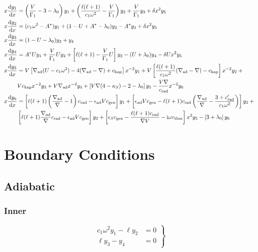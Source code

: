 \documentclass{article}
\newcommand{\diff}{\ensuremath{\mathrm{d}}}
\newcommand{\ii}{\ensuremath{\mathrm{i}}}
\newcommand{\lz}{\ensuremath{\lambda_{0}}}
\newcommand{\Vg}{\ensuremath{\frac{V}{\Gamma_{1}}}}
\newcommand{\As}{\ensuremath{A^{\ast}}}
\newcommand{\nabad}{\ensuremath{\nabla_{\rm ad}}}
\newcommand{\kapS}{\ensuremath{\kappa_{S}}}
\newcommand{\epsad}{\ensuremath{\epsilon_{\rm ad}}}
\newcommand{\epsS}{\ensuremath{\epsilon_{S}}}
\newcommand{\crad}{\ensuremath{c_{\rm rad}}}
\newcommand{\cgen}{\ensuremath{c_{\rm gen}}}
\newcommand{\cthm}{\ensuremath{c_{\rm thm}}}
\newcommand{\ckap}{\ensuremath{c_{\rm kap}}}
\begin{document}
\begin{align*}
x \frac{\diff y_{1}}{\diff x} &=
\left(\Vg - 3 - \lz \right) y_{1} +
\left(\frac{\ell(\ell+1)}{c_{1} \omega^{2}} - \Vg \right) y_{2} +
\Vg y_{3} +
\delta x^{2} y_{5} \\
x \frac{\diff y_{2}}{\diff x} &=
(c_{1} \omega^{2} - \As ) y_{1} +
(1 - U + \As - \lz) y_{2} -
\As y_{3} +
\delta x^{2} y_{5} \\
x \frac{\diff y_{3}}{\diff x} &=
(1 - U - \lz) y_{3} +
y_{4} \\
x \frac{\diff y_{4}}{\diff x} &=
\As U y_{1} +
\Vg U y_{2} +
\left[ \ell(\ell+1) - \Vg U \right] y_{3} -
(U + \lz) y_{4}
- \delta U x^{2} y_{5} \\
x \frac{\diff y_{5}}{\diff x} &=
V \left[ \nabad (U - c_{1}\omega^{2}) - 4 (\nabad - \nabla) + \ckap \right] x^{-2} y_{1} + 
V \left[ \frac{\ell(\ell+1)}{c_{1} \omega^{2}} (\nabad - \nabla) - \ckap \right] x^{-2} y_{2} + \mbox{} \\
& 
V \ckap x^{-2} y_{3} + 
V \nabad x^{-2} y_{4} + 
\left[ V \nabla (4 - \kapS) - 2 - \lz \right] y_{5} -
\frac{V \nabla}{\crad} x^{-2} y_{6} \\
x \frac{\diff y_{6}}{\diff x} &=
\left[ \ell(\ell+1)\left( \frac{\nabad}{\nabla} - 1 \right) \crad - \epsad V \cgen \right] y_{1} +
\left[ \epsad V \cgen - \ell(\ell+1)\crad \left( \frac{\nabad}{\nabla} - \frac{3 + \crad'}{c_{1}\omega^{2}} \right) \right] y_{2} + \mbox{} \\
&
\left[ \ell(\ell+1) \frac{\nabad}{\nabla} \crad - \epsad V \cgen \right] y_{3} +
\left[ \epsS \cgen - \frac{\ell(\ell+1)\crad}{\nabla V} - \ii \omega \cthm\right] x^{2} y_{5} -
\left[ 3 + \lz \right] y_{6}
\end{align*}


\section*{Boundary Conditions}

\subsection*{Adiabatic}

\subsubsection*{Inner}

\begin{equation*}
\left.
\begin{aligned}
c_{1} \omega^{2} y_{1} - \ell y_{2} &= 0 \\
\ell y_{3} - y_{4} &= 0
\end{aligned}
\right\}
\end{equation*}
\end{document}
